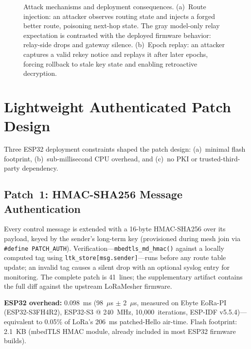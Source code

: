 \documentclass[preprint,12pt]{elsarticle}
\begin{document}
\begin{figure}[t]
{%
  }
  \caption{Attack mechanisms and deployment consequences.
           (a)~Route injection: an attacker observes routing state and
           injects a forged better route, poisoning next-hop state. The
           gray model-only relay expectation is contrasted with the deployed
           firmware behavior: relay-side drops and gateway silence.
           (b)~Epoch replay: an attacker captures a valid rekey notice and
           replays it after later epochs, forcing rollback to stale key state
           and enabling retroactive decryption.}
  \label{fig:attack-seq}
\end{figure}

\section{Lightweight Authenticated Patch Design}
\label{sec:patch}

Three ESP32 deployment constraints shaped the patch design:
(a)~minimal flash footprint, (b)~sub-millisecond CPU overhead,
and (c)~no PKI or trusted-third-party dependency.

\subsection{Patch~1: HMAC-SHA256 Message Authentication}

Every control message is extended with a 16-byte HMAC-SHA256
over its payload, keyed by the sender's long-term key
(provisioned during mesh join via \texttt{\#define PATCH\_AUTH}).
Verification—\texttt{mbedtls\_md\_hmac()} against a locally computed
tag using \texttt{ltk\_store[msg.sender]}—runs before any route
table update; an invalid tag causes a silent drop with an
optional syslog entry for monitoring.
The complete patch is 41~lines; the supplementary artifact
contains the full diff against the upstream LoRaMesher firmware.

\textbf{ESP32 overhead:} 0.098~ms (98~$\mu$s $\pm$ 2~$\mu$s,
measured on Ebyte EoRa-PI (ESP32-S3FH4R2), ESP32-S3 @ 240~MHz,
10,000~iterations, ESP-IDF v5.5.4)—equivalent to
0.05\% of LoRa's 206~ms patched-Hello air-time. Flash footprint: 2.1~KB (mbedTLS
HMAC module, already included in most ESP32 firmware builds).
\end{document}
